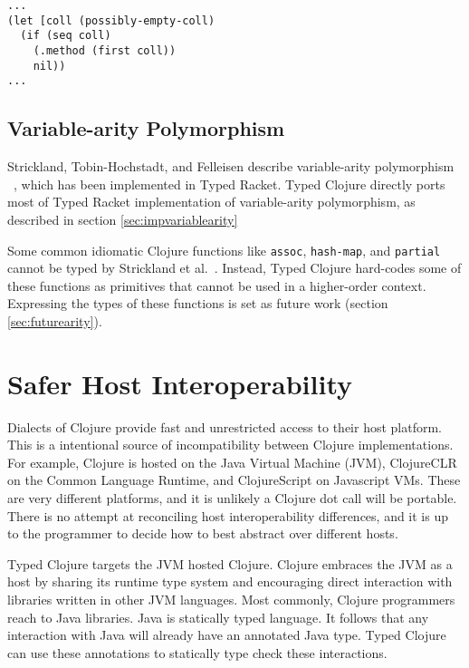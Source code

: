 \begin{lstlisting}[caption=Example of using the sequence abstraction with occurrence typing, label=lst:seqocc]
...
(let [coll (possibly-empty-coll)
  (if (seq coll)
    (.method (first coll))
    nil))
...
\end{lstlisting}

\subsection{Variable-arity Polymorphism}

Strickland, Tobin-Hochstadt, and Felleisen describe variable-arity poly\-morphism ~\cite{STF09},
which has been implemented in Typed Racket.
Typed Clojure directly ports most of Typed Racket implementation of variable-arity polymorphism,
as described in section \ref{sec:impvariablearity}

Some common idiomatic Clojure functions like \lstinline|assoc|, \lstinline|hash-map|,
and \lstinline|partial| cannot be typed by Strickland et al.\ .
Instead, Typed Clojure hard-codes some of these functions as primitives that cannot
be used in a higher-order context.
Expressing the types of these functions is set as future work (section \ref{sec:futurearity}).

\section{Safer Host Interoperability}

Dialects of Clojure provide fast and unrestricted access to their host platform. 
This is a intentional source of incompatibility between Clojure implementations.
For example, Clojure is hosted on the Java Virtual Machine (JVM), ClojureCLR on the Common Language Runtime,
and ClojureScript on Javascript VMs. These are very different platforms, and it is unlikely
a Clojure dot call will be portable. There is no attempt at reconciling
host interoperability differences, and it is up to the programmer to decide
how to best abstract over different hosts.

Typed Clojure targets the JVM hosted Clojure.
Clojure embraces the JVM as a host by sharing its runtime type system and encouraging direct
interaction with libraries written in other JVM languages. Most commonly, Clojure programmers
reach to Java libraries. Java is statically typed language. It follows that any interaction with
Java will already have an annotated Java type. Typed Clojure can use these annotations
to statically type check these interactions.

